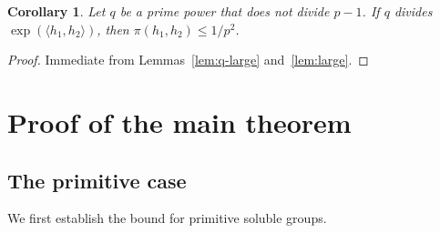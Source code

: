 \documentclass{amsart}
\newtheorem{corollary}{Corollary}
\begin{document}
\begin{corollary}\label{cor:q-large}
	Let $q$ be a prime power that does not divide $p-1$. If $q$ 
	divides $\exp(\langle h_1, h_2 \rangle)$, then 
	$\pi(h_1,h_2) \leq 1/p^2$.
\end{corollary}
\begin{proof}
	Immediate from Lemmas~\ref{lem:q-large} and~\ref{lem:large}.
	\end{proof}


	\section{Proof of the main theorem}
	
	\subsection{The primitive case}
	
	We first establish the bound for primitive soluble groups.
	
\end{document}
